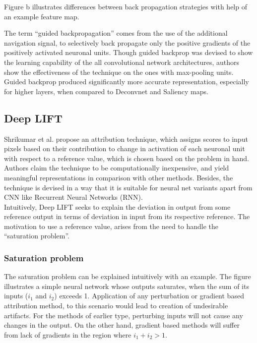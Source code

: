 \documentclass[../report.tex]{subfiles}
\begin{document}
Figure b illustrates differences between back propagation strategies with help of an example feature map. 

The term \enquote{guided backpropagation} comes from the use of the additional navigation signal, to selectively back propagate only the positive gradients of the positively activated neuronal units. Though guided backprop was devised to show the learning capability of the all convolutional network architectures, authors show the effectiveness of the technique on the ones with max-pooling units. Guided backprop produced significantly more accurate representation, especially  for higher layers, when compared to Deconvnet and Saliency maps.

\subsection{Deep LIFT}
 Shrikumar et al. propose an attribution technique, which assigns scores to input pixels based on their contribution to change in activation of each neuronal unit with respect to a reference value, which is chosen based on the problem in hand. Authors claim the technique to be computationally inexpensive, and yield meaningful representations in comparison with other methods. Besides, the technique is devised in a way that it is suitable for neural net variants apart from CNN like Recurrent Neural Networks (RNN).\\
 Intuitively, Deep LIFT seeks to explain the deviation in output from some reference output in terms of deviation in input from its respective reference. The motivation to use a reference value, arises from the need to handle the \enquote{saturation problem}.
 \subsubsection{Saturation problem}\label{sec_saturation}
 The saturation problem can be explained intuitively with an example. The figure illustrates a simple neural network whose outputs saturates, when the sum of its inputs ($i_1$ and $i_2$) exceeds 1. Application of any perturbation or gradient based attribution method, to this scenario would lead to creation of undesirable artifacts. For the methods of earlier type, perturbing inputs will not cause any changes in the output. On the other hand, gradient based methods will suffer from lack of gradients in the region where $i_1+i_2 > 1$.
\end{document}
